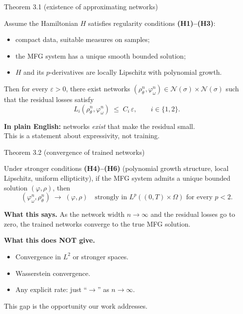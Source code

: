 \documentclass[10pt,aspectratio=169]{beamer}
\newcommand{\teal}[1]{\textcolor{kaustteal}{#1}}
\newcommand{\citehl}[1]{\textcolor{kaustblue!80!black}{\textbf{[#1]}}}
\begin{document}
\begin{frame}{Theorem 3.1 (existence of approximating networks)}
\begin{resultbox}[title=Theorem 3.1 (\citehl{Assouline--Missaoui 2023})]
Assume the Hamiltonian $H$ satisfies regularity conditions \textbf{(H1)--(H3)}:
\begin{itemize}\setlength\itemsep{1pt}
  \item compact data, suitable measures on samples;
  \item the MFG system has a unique smooth bounded solution;
  \item $H$ and its $p$-derivatives are locally Lipschitz with polynomial growth.
\end{itemize}

\medskip
Then for every $\varepsilon > 0$, there exist networks
$(\rho_\theta^n,\varphi_\omega^n) \in \mathcal{N}(\sigma)\times\mathcal{N}(\sigma)$
such that the residual losses satisfy
\[
  L_i(\rho_\theta^n,\varphi_\omega^n) \;\leq\; C_i\,\varepsilon,
  \qquad i\in\{1,2\}.
\]
\end{resultbox}

\medskip
\textbf{In plain English:} networks \emph{exist} that make the residual small.\\
This is a statement about \alert{expressivity}, not training.
\end{frame}

\begin{frame}{Theorem 3.2 (convergence of trained networks)}
\begin{resultbox}[title=Theorem 3.2 (\citehl{Assouline--Missaoui 2023})]
Under stronger conditions \textbf{(H4)--(H6)} (polynomial growth structure,
local Lipschitz, uniform ellipticity), if the MFG system admits a unique
bounded solution $(\varphi,\rho)$, then
\[
  (\varphi_\omega^n,\rho_\theta^n) \;\to\; (\varphi,\rho)
  \quad\text{strongly in } L^p((0,T)\times\Omega) \text{ for every } p<2.
\]
\end{resultbox}

\medskip
\textbf{What this says.}  As the network width $n \to \infty$ and the residual
losses go to zero, the trained networks converge to the true MFG solution.

\medskip
\textbf{What this does NOT give.}
\begin{itemize}\setlength\itemsep{1pt}
  \item Convergence in $L^2$ or stronger spaces.
  \item Wasserstein convergence.
  \item Any explicit \alert{rate}: just ``$\to$'' as $n\to\infty$.
\end{itemize}

\medskip
\teal{This gap is the opportunity our work addresses.}
\end{frame}
\end{document}
